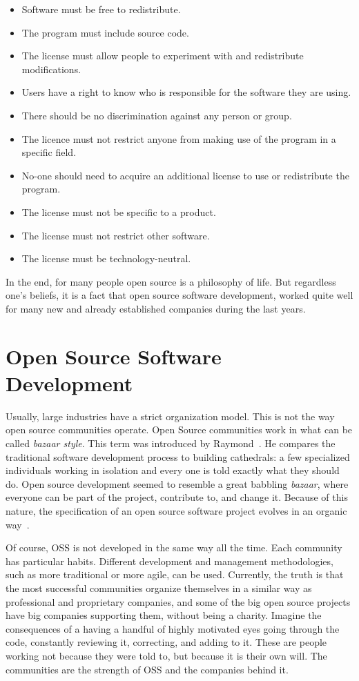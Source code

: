 \begin{itemize}
\item Software must be free to redistribute.
\item The program must include source code.
\item The license must allow people to experiment with and redistribute modifications.
\item Users have a right to know who is responsible for the software they are using.
\item There should be no discrimination against any person or group.
\item The licence must not restrict anyone from making use of the program in a specific field.
\item No-one should need to acquire an additional license to use or redistribute the program.
\item The license must not be specific to a product.
\item The license must not restrict other software.
\item The license must be technology-neutral.
\end{itemize}

In the end, for many people open source is a philosophy of life. 
But regardless one's beliefs, it is a fact that open source software development, 
worked quite well for many new and already established companies during the last years.


\section{Open Source Software Development}
Usually, large industries have a strict organization model. This is not the way open source communities operate.
Open Source communities work in what can be called \textit{bazaar style}.
This term was introduced by Raymond~\cite{raymondcathedral}. 
He compares the traditional software development process to building cathedrals:
a few specialized individuals working in isolation and every one is told exactly what they should do.
Open source development seemed to resemble a great babbling \textit{bazaar}, 
where everyone can be part of the project, contribute to, and change it. 
Because of this nature, the specification of an open source software project 
evolves in an organic way~\cite{capiluppicathedral}.

Of course, OSS is not developed in the same way all the time. 
Each community has particular habits. 
Different development and management methodologies, such as more traditional or more agile, can be used.
Currently, the truth is that the most successful communities organize themselves 
in a similar way as professional and proprietary companies, 
and some of the big open source projects have big companies supporting them, 
without being a charity.
Imagine the consequences of a having a handful of highly motivated eyes going through the code, 
constantly reviewing it, correcting, and adding to it.
These are people working not because they were told to, but because it is their own will.
The communities are the strength of OSS and the companies behind it.

